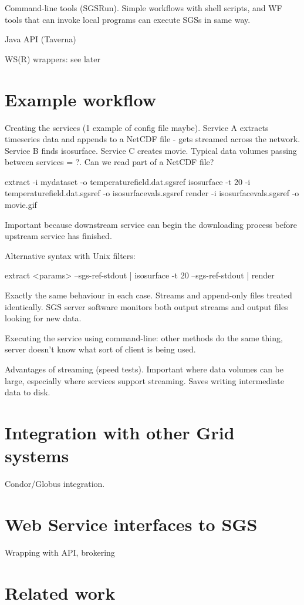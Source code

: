 \documentclass[a4paper]{article}
\begin{document}
Command-line tools (SGSRun).  Simple workflows with shell scripts, and WF tools that can invoke local programs can execute SGSs in same way.

Java API (Taverna)

WS(R) wrappers: see later

\section{Example workflow}

Creating the services (1 example of config file maybe).  Service A extracts timeseries data and appends to a NetCDF file - gets streamed across the network.  Service B finds isosurface.  Service C creates movie.  Typical data volumes passing between services = ?.  Can we read part of a NetCDF file?

extract -i mydataset -o temperaturefield.dat.sgsref
isosurface -t 20 -i temperaturefield.dat.sgsref -o isosurfacevals.sgsref
render -i isosurfacevals.sgsref -o movie.gif

Important because downstream service can begin the downloading process before upstream service has finished.

Alternative syntax with Unix filters:

extract <params> --sgs-ref-stdout | isosurface -t 20 --sgs-ref-stdout | render

Exactly the same behaviour in each case.  Streams and append-only files treated identically.  SGS server software monitors both output streams and output files looking for new data.

Executing the service using command-line: other methods do the same thing, server doesn't know what sort of client is being used.

Advantages of streaming (speed tests).  Important where data volumes can be large, especially where services support streaming.  Saves writing intermediate data to disk.

\section{Integration with other Grid systems}
Condor/Globus integration.

\section{Web Service interfaces to SGS}
Wrapping with API, brokering

\section{Related work}
\end{document}
